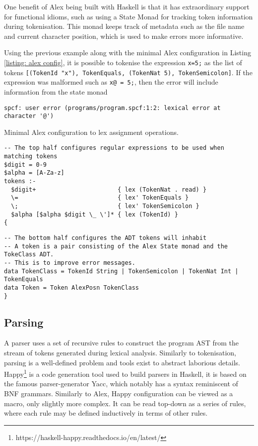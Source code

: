 \documentclass[12pt,a4paper]{report}
\theoremstyle{definition}
\theoremstyle{remark}
\begin{document}
One benefit of Alex being built with Haskell is that it has extraordinary support for functional idioms, such as using a State Monad for tracking token information during tokenisation. This monad keeps track of metadata such as the file name and current character position, which is used to make errors more informative. 

Using the previous example along with the minimal Alex configuration in Listing \ref{listing: alex config}, it is possible to tokenise the expression \lstinline{x=5;} as the list of tokens \lstinline{[(TokenId "x"), TokenEquals, (TokenNat 5), TokenSemicolon]}. If the expression was malformed such as \lstinline{x@ = 5;}, then the error will include information from the state monad
\begin{verbatim}
spcf: user error (programs/program.spcf:1:2: lexical error at character '@')
\end{verbatim}

\begin{listing}
\label{listing: alex config}
\caption{Minimal Alex configuration to lex assignment operations.}
\begin{verbatim}
-- The top half configures regular expressions to be used when matching tokens
$digit = 0-9
$alpha = [A-Za-z]
tokens :-
  $digit+                       { lex (TokenNat . read) }
  \=                            { lex' TokenEquals }
  \;                            { lex' TokenSemicolon }
  $alpha [$alpha $digit \_ \']* { lex (TokenId) }
{
\end{verbatim}
\begin{verbatim}
-- The bottom half configures the ADT tokens will inhabit
-- A token is a pair consisting of the Alex State monad and the TokeClass ADT.
-- This is to improve error messages.
data TokenClass = TokenId String | TokenSemicolon | TokenNat Int | TokenEquals
data Token = Token AlexPosn TokenClass
}
\end{verbatim}
\end{listing}

\subsection{Parsing} 
A parser uses a set of recursive rules to construct the program AST from the stream of tokens generated during lexical analysis. Similarly to tokenisation, parsing is a well-defined problem and tools exist to abstract laborious details. Happy\footnote{https://haskell-happy.readthedocs.io/en/latest/} is a code generation tool used to build parsers in Haskell, it is based on the famous parser-generator Yacc, which notably has a syntax reminiscent of BNF grammars. Similarly to Alex, Happy configuration can be viewed as a macro, only slightly more complex. It can be read top-down as a series of rules, where each rule may be defined inductively in terms of other rules. 
\end{document}
